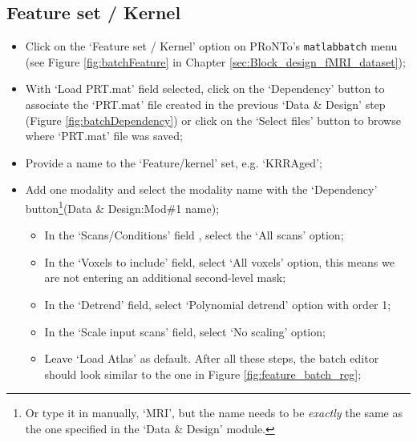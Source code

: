 \subsection{Feature set / Kernel}

\begin{itemize}
	\item Click on the `Feature set / Kernel' option on PRoNTo's {\tt matlabbatch} menu (see Figure \ref{fig:batchFeature} in Chapter \ref{sec:Block_design_fMRI_dataset});
	
	\item With `Load PRT.mat' field selected, click on the `Dependency' button to associate the `PRT.mat' file created in the previous `Data \& Design' step (Figure \ref{fig:batchDependency}) or click on the `Select files' button to browse where `PRT.mat' file was saved;
	
	
    \item Provide a name to the `Feature/kernel' set, e.g. `KRRAged';
	
	\item Add one modality and select the modality name with the `Dependency' button\footnote{Or type it in manually, `MRI', but the name needs to be {\it exactly} the same as the one specified in the `Data \& Design' module.}(Data \& Design:Mod\#1 name);
	
		\begin{itemize}
	
	\item In the `Scans/Conditions' field , select the `All scans' option;
	
	\item In the `Voxels to include' field, select `All voxels' option, this means we are not entering an additional second-level mask;
	
	\item In the `Detrend' field, select `Polynomial detrend' option with order 1;
	
	\item In the `Scale input scans' field, select `No scaling' option;
	
	\item Leave `Load Atlas' as default. After all these steps, the batch editor should look similar to the one in Figure \ref{fig:feature_batch_reg};
	

\end{itemize}
\end{itemize}

